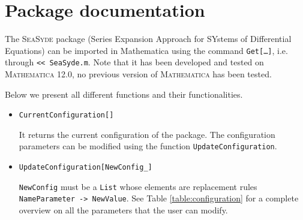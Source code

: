 \section{Package documentation}
\label{app:packagedoc}


The \textsc{SeaSyde} package (Series Expansion Approach for SYstems of Differential Equations) can be imported in Mathematica using the command \texttt{Get[\dots]}, i.e. through \texttt{<< SeaSyde.m}. Note that it has been developed and tested on \textsc{Mathematica 12.0}, no previous version of \textsc{Mathematica} has been tested. 

Below we present all different functions and their functionalities. 
\begin{itemize}
    \item \texttt{CurrentConfiguration[]}
    
    It returns the current configuration of the package. The configuration parameters can be modified using the function \texttt{UpdateConfiguration}.
    
    \item \texttt{UpdateConfiguration[NewConfig\_]}
    
    \texttt{NewConfig} must be a \texttt{List} whose elements are replacement rules \texttt{NameParameter -> NewValue}. See Table \ref{table:configuration} for a complete overview on all the parameters that the user can modify.
    

\end{itemize}
